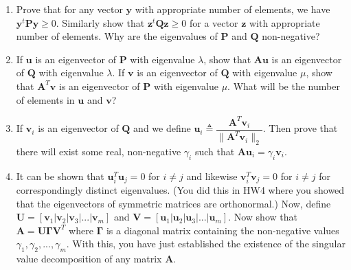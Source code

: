 \documentclass{article}
\begin{document}
\begin{enumerate}
\begin{enumerate}
        \begin{enumerate}
            \item Prove that for any vector $\boldsymbol{y}$ with appropriate number of elements, we have $\boldsymbol{y}^t \boldsymbol{Py} \geq 0$. Similarly show that $\boldsymbol{z}^t \boldsymbol{Qz} \geq 0$ for a vector $\boldsymbol{z}$ with appropriate number of elements. Why are the eigenvalues of $\boldsymbol{P}$ and $\boldsymbol{Q}$ non-negative?
            \item If $\boldsymbol{u}$ is an eigenvector of $\boldsymbol{P}$ with eigenvalue $\lambda$, show that $\boldsymbol{Au}$ is an eigenvector of $\boldsymbol{Q}$ with eigenvalue $\lambda$. If $\boldsymbol{v}$ is an eigenvector of $\boldsymbol{Q}$ with eigenvalue $\mu$, show that $\boldsymbol{A}^T\boldsymbol{v}$ is an eigenvector of $\boldsymbol{P}$ with eigenvalue $\mu$. What will be the number of elements in $\boldsymbol{u}$ and $\boldsymbol{v}$?
            
            \item If $\boldsymbol{v}_i$ is an eigenvector of $\boldsymbol{Q}$ and we define $\boldsymbol{u}_i \triangleq \dfrac{\boldsymbol{A}^T \boldsymbol{v}_i}{\|\boldsymbol{A}^T \boldsymbol{v}_i\|_2}$. Then prove that there will exist some real, non-negative $\gamma_i$ such that $\boldsymbol{Au}_i = \gamma_i \boldsymbol{v}_i$.
            
            \item It can be shown that $\boldsymbol{u}^T_i \boldsymbol{u}_j = 0$ for $i \neq j$ and likewise $\boldsymbol{v}^T_i \boldsymbol{v}_j = 0$ for $i \neq j$ for correspondingly distinct eigenvalues. (You did this in HW4 where you showed that the eigenvectors of symmetric matrices are orthonormal.) Now, define $\boldsymbol{U} = [\boldsymbol{v}_1 | \boldsymbol{v}_2 | \boldsymbol{v}_3 | ...|\boldsymbol{v}_m]$ and $\boldsymbol{V} = [\boldsymbol{u}_1 | \boldsymbol{u}_2 | \boldsymbol{u}_3 | ... |\boldsymbol{u}_m]$. Now show that $\boldsymbol{A} = \boldsymbol{U} \boldsymbol{\Gamma} \boldsymbol{V}^T$ where $\boldsymbol{\Gamma}$ is a diagonal matrix containing the non-negative values $\gamma_1, \gamma_2, ..., \gamma_m$. With this, you have just established the existence of the singular value decomposition of any matrix $\boldsymbol{A}$. 
        \end{enumerate}
    \end{enumerate}
    
    \\
    \\
    

\end{enumerate}
\end{document}
